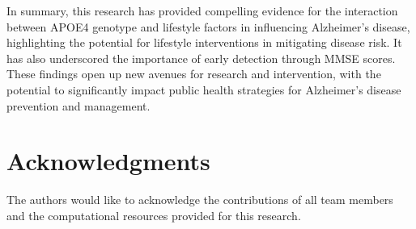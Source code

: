 \documentclass[conference]{IEEEtran}
\begin{document}
In summary, this research has provided compelling evidence for the interaction between APOE4 genotype and lifestyle factors in influencing Alzheimer's disease, highlighting the potential for lifestyle interventions in mitigating disease risk. It has also underscored the importance of early detection through MMSE scores. These findings open up new avenues for research and intervention, with the potential to significantly impact public health strategies for Alzheimer's disease prevention and management.

\section{Acknowledgments}
The authors would like to acknowledge the contributions of all team members and the computational resources provided for this research.
\end{document}

